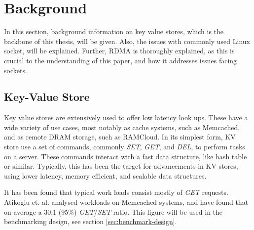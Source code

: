 
\chapter{Background}\label{ch:background} %



\ifpdf
    \graphicspath{{7/figures/PNG/}{7/figures/PDF/}{7/figures/}}
\else
    \graphicspath{{7/figures/EPS/}{7/figures/}}
\fi


%
%
In this section, background information on key value stores, which is the backbone of this thesis, will be given.
Also, the issues with commonly used Linux socket, will be explained.
Further, RDMA is thoroughly explained, as this is crucial to the understanding of this paper, and how it addresses issues facing sockets.

\section[Key-Value store]{Key-Value Store}\label{sec:kv-store}
Key value stores are extensively used to offer low latency look ups.
These have a wide variety of use cases, most notably as cache systems, such as Memcached\cite{memcached}, and as remote DRAM storage, such as RAMCloud\cite{ousterhout2010case}.
In its simplest form, KV store use a set of commands, commonly \textit{SET}, \textit{GET}, and \textit{DEL}, to perform tasks on a server.
These commands interact with a fast data structure, like hash table or similar.
Typically, this has been the target for advancements in KV stores, using lower latency, memory efficient, and scalable data structures\cite{lim2014mica, escriva2012hyperdex}.

It has been found that typical work loads consist mostly of \textit{GET} requests.
Atikoglu et. al. analysed workloads on Memcached systems, and have found that on average a 30:1 (95\%) \textit{GET}/\textit{SET} ratio\cite{atikoglu2012workload}.
This figure will be used in the benchmarking design, see section \ref{sec:benchmark-design}.


